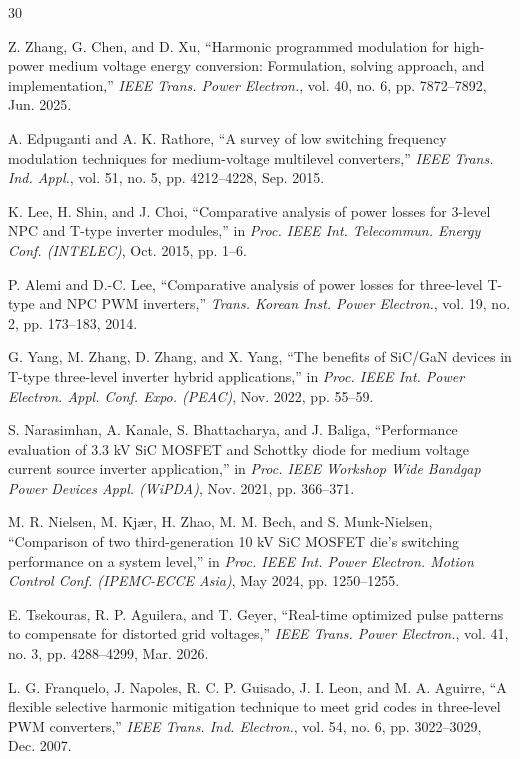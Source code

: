 \documentclass[conference]{IEEEtran}
\newcommand{\com}[1]{\par\smallskip\noindent{\color{blue}#1}\par\smallskip}
\renewcommand{\com}[1]{}       %
\begin{document}
\com{Comentario: al final vere las bibliografias que falten}

\begin{thebibliography}{30}

Z. Zhang, G. Chen, and D. Xu, ``Harmonic programmed modulation for high-power
medium voltage energy conversion: Formulation, solving approach, and
implementation,'' \emph{IEEE Trans. Power Electron.}, vol. 40, no. 6, pp.
7872--7892, Jun. 2025.

A. Edpuganti and A. K. Rathore, ``A survey of low switching frequency modulation
techniques for medium-voltage multilevel converters,'' \emph{IEEE Trans. Ind.
Appl.}, vol. 51, no. 5, pp. 4212--4228, Sep. 2015.

K. Lee, H. Shin, and J. Choi, ``Comparative analysis of power losses for 3-level
NPC and T-type inverter modules,'' in \emph{Proc. IEEE Int. Telecommun. Energy
Conf. (INTELEC)}, Oct. 2015, pp. 1--6.

P. Alemi and D.-C. Lee, ``Comparative analysis of power losses for three-level
T-type and NPC PWM inverters,'' \emph{Trans. Korean Inst. Power Electron.}, vol.
19, no. 2, pp. 173--183, 2014.

G. Yang, M. Zhang, D. Zhang, and X. Yang, ``The benefits of SiC/GaN devices in
T-type three-level inverter hybrid applications,'' in \emph{Proc. IEEE Int. Power
Electron. Appl. Conf. Expo. (PEAC)}, Nov. 2022, pp. 55--59.

S. Narasimhan, A. Kanale, S. Bhattacharya, and J. Baliga, ``Performance
evaluation of 3.3 kV SiC MOSFET and Schottky diode for medium voltage current
source inverter application,'' in \emph{Proc. IEEE Workshop Wide Bandgap Power
Devices Appl. (WiPDA)}, Nov. 2021, pp. 366--371.

M. R. Nielsen, M. Kj\ae r, H. Zhao, M. M. Bech, and S. Munk-Nielsen,
``Comparison of two third-generation 10 kV SiC MOSFET die's switching performance
on a system level,'' in \emph{Proc. IEEE Int. Power Electron. Motion Control
Conf. (IPEMC-ECCE Asia)}, May 2024, pp. 1250--1255.

E. Tsekouras, R. P. Aguilera, and T. Geyer, ``Real-time optimized pulse
patterns to compensate for distorted grid voltages,'' \emph{IEEE Trans. Power
Electron.}, vol. 41, no. 3, pp. 4288--4299, Mar. 2026.

L. G. Franquelo, J. Napoles, R. C. P. Guisado, J. I. Leon, and M. A. Aguirre,
``A flexible selective harmonic mitigation technique to meet grid codes in
three-level PWM converters,'' \emph{IEEE Trans. Ind. Electron.}, vol. 54,
no. 6, pp. 3022--3029, Dec. 2007.


\end{thebibliography}
\end{document}
